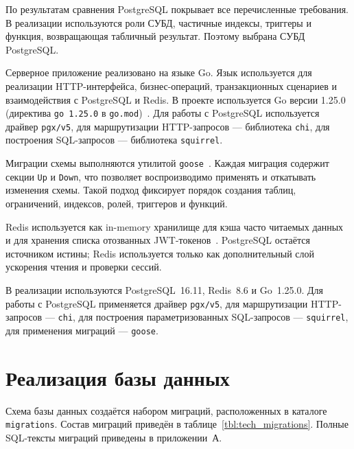 По результатам сравнения PostgreSQL покрывает все перечисленные требования. В реализации используются роли СУБД, частичные индексы, триггеры и функция, возвращающая табличный результат. Поэтому выбрана СУБД PostgreSQL.

Серверное приложение реализовано на языке Go. Язык используется для реализации HTTP-интерфейса, бизнес-операций, транзакционных сценариев и взаимодействия с PostgreSQL и Redis. В проекте используется Go версии 1.25.0 (директива \texttt{go 1.25.0} в \texttt{go.mod})~\cite{go_doc}. Для работы с PostgreSQL используется драйвер \texttt{pgx/v5}, для маршрутизации HTTP-запросов --- библиотека \texttt{chi}, для построения SQL-запросов --- библиотека \texttt{squirrel}.

Миграции схемы выполняются утилитой \texttt{goose}~\cite{goose_doc}. Каждая миграция содержит секции \texttt{Up} и \texttt{Down}, что позволяет воспроизводимо применять и откатывать изменения схемы. Такой подход фиксирует порядок создания таблиц, ограничений, индексов, ролей, триггеров и функций.

Redis используется как in-memory хранилище для кэша часто читаемых данных и для хранения списка отозванных JWT-токенов~\cite{redis_doc}. PostgreSQL остаётся источником истины; Redis используется только как дополнительный слой ускорения чтения и проверки сессий.

В реализации используются PostgreSQL~16.11, Redis~8.6 и Go~1.25.0. Для работы с PostgreSQL применяется драйвер \texttt{pgx/v5}, для маршрутизации HTTP-запросов --- \texttt{chi}, для построения параметризованных SQL-запросов --- \texttt{squirrel}, для применения миграций --- \texttt{goose}.

\section{Реализация базы данных}

Схема базы данных создаётся набором миграций, расположенных в каталоге \texttt{migrations}. Состав миграций приведён в таблице~\ref{tbl:tech_migrations}. Полные SQL-тексты миграций приведены в приложении~А.

